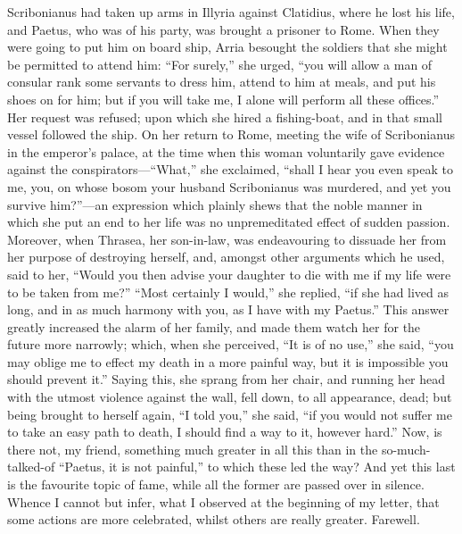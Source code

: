 Scribonianus had taken up arms in Illyria against Clatidius, where he lost
his life, and Paetus, who was of his party, was brought a prisoner to
Rome. When they were going to put him on board ship, Arria besought the
soldiers that she might be permitted to attend him: ``For surely,'' she
urged, ``you will allow a man of consular rank some servants to dress him,
attend to him at meals, and put his shoes on for him; but if you will take
me, I alone will perform all these offices.'' Her request was refused; upon
which she hired a fishing-boat, and in that small vessel followed the
ship. On her return to Rome, meeting the wife of Scribonianus in the
emperor's palace, at the time when this woman voluntarily gave evidence
against the conspirators—``What,'' she exclaimed, ``shall I hear you
even speak to me, you, on whose bosom your husband Scribonianus was
murdered, and yet you survive him?''—an expression which plainly
shews that the noble manner in which she put an end to her life was no
unpremeditated effect of sudden passion. Moreover, when Thrasea, her
son-in-law, was endeavouring to dissuade her from her purpose of
destroying herself, and, amongst other arguments which he used, said to
her, ``Would you then advise your daughter to die with me if my life were
to be taken from me?'' ``Most certainly I would,'' she replied, ``if she had
lived as long, and in as much harmony with you, as I have with my Paetus.''
This answer greatly increased the alarm of her family, and made them watch
her for the future more narrowly; which, when she perceived, ``It is of no
use,'' she said, ``you may oblige me to effect my death in a more painful
way, but it is impossible you should prevent it.'' Saying this, she sprang
from her chair, and running her head with the utmost violence against the
wall, fell down, to all appearance, dead; but being brought to herself
again, ``I told you,'' she said, ``if you would not suffer me to take an easy
path to death, I should find a way to it, however hard.'' Now, is there
not, my friend, something much greater in all this than in the
so-much-talked-of ``Paetus, it is not painful,'' to which these led the way?
And yet this last is the favourite topic of fame, while all the former are
passed over in silence. Whence I cannot but infer, what I observed at the
beginning of my letter, that some actions are more celebrated, whilst
others are really greater. Farewell.


